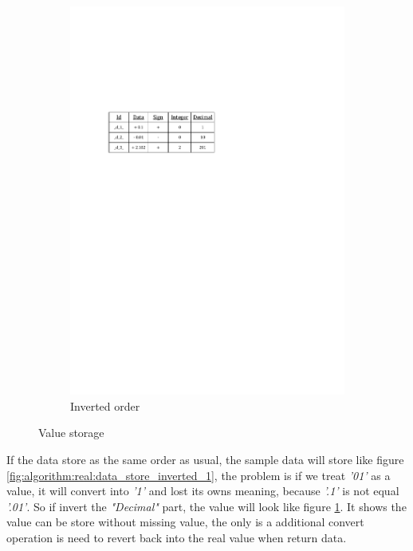 \begin{figure}[h]
\begin{subfigure}[b]{0.4\textwidth}
        \includegraphics[width=\textwidth]{./algorithm/real/pic/design/data_store_inverted_2_v1.pdf}
        \caption{Inverted order}
        \label{fig:algorithm:real:data_store_inverted_2}
    \end{subfigure}

    \caption{Value storage}
    \label{fig:algorithm:real:data_store_inverted}
\end{figure}

If the data store as the same order as usual, the sample data will store like figure \ref{fig:algorithm:real:data_store_inverted_1}, the problem is if we treat \textit{'01'} as a value, it will convert into \textit{'1'} and lost its owns meaning, because \textit{'.1'} is not equal \textit{'.01'}. So if invert the \textit{"Decimal"} part, the value will look like figure \ref{fig:algorithm:real:data_store_inverted_2}. It shows the value can be store without missing value, the only is a additional convert operation is need to revert back into the real value when return data.\\

